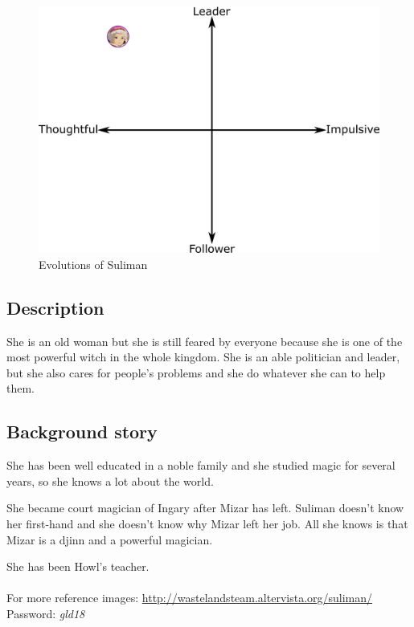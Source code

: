\begin{figure}[H]
  \centering
   \includegraphics[width=14cm]{Images/Diagrams/Evolutions/sulimanEvolution}
  \caption{Evolutions of Suliman}
\end{figure}

\subsection{Description}
She is an old woman but she is still feared by everyone because she is one of the most powerful witch in the whole kingdom. She is an able politician and leader, but she also cares for people's problems and she do whatever she can to help them.

\subsection{Background story}
She has been well educated in a noble family and she studied magic for several years, so she knows a lot about the world.

She became court magician of Ingary after Mizar has left. Suliman doesn't know her first-hand and she doesn't know why Mizar left her job. All she knows is that Mizar is a djinn and a powerful magician.

She has been Howl's teacher.\\\\
For more reference images: \url{http://wastelandsteam.altervista.org/suliman/}\\
Password: \textit{gld18}
